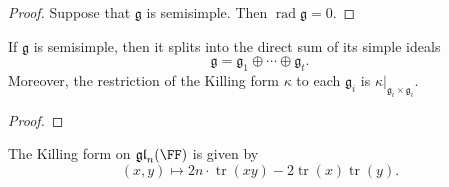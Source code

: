\documentclass{article}
\DeclareMathOperator{\tr}{tr}
\DeclareMathOperator{\rad}{rad}
\newcommand*\frkg{{\ensuremath{\mathfrak{g}}}}
\newcommand*\gl{\ensuremath{\mathfrak{gl}}}
\begin{document}
\begin{proof}
    Suppose that $\frkg$ is semisimple.
    Then $\rad \frkg = 0$.
\end{proof}

\begin{theorem}
    If $\frkg$ is semisimple, then it splits into the direct sum of its simple ideals
    \[
        \frkg
        =
        \frkg_1 \oplus \cdots \oplus \frkg_t.
    \]
    Moreover, the restriction of the Killing form $\kappa$ to each $\frkg_i$ is $\kappa|_{\frkg_i\times\frkg_i}$.
\end{theorem}

\begin{proof}

\end{proof}

\begin{theorem}
    The Killing form on $\gl_n(\FF)$ is given by
    \[
        (x, y)
        \mapsto
        2n\cdot\tr(xy) - 2\tr(x)\tr(y).
    \]
\end{theorem}
\end{document}
